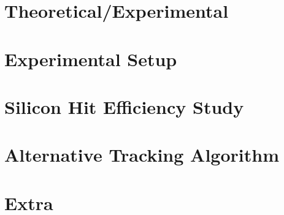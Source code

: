 \documentclass[twoside,11pt]{report}
\numberwithin{equation}{section}
\begin{document}
	\fancyhead{}
	
	
	
	
	
	
	
	\newpage
	\tableofcontents
	\newpage
	\listoffigures
	\listoftables
	\newpage
	\fancyhead[RO,LE]{\changefont }
	\fancyhead[RE,LO]{\changefont \leftmark}
	\part{Theoretical/Experimental}
	
        \part{Experimental Setup}
        
        \part{Silicon Hit Efficiency Study}
        
        \part{Alternative Tracking Algorithm}
        
	\part{Extra}
	\newpage
	\begin{appendices}
	
	\end{appendices}	
	
	
\end{document}

